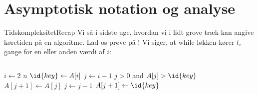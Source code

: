\documentclass[aspectratio=1610]{beamer}
\begin{document}
\section{Asymptotisk notation og analyse}

\begin{frame}{Tidskompleksitet}{Recap}
    Vi så i sidste uge, hvordan vi i lidt grove træk kan angive køretiden på en
    algoritme. Lad os prøve på ! Vi siger, at while-løkken
    kører $t_i$ gange for en eller anden værdi af $i$:

    \begin{columns}
        \begin{codebox}
            \li \For $i \gets 2$ \To $n$ \Do
                \li $\id{key} \gets A[i]$
                \li $j \gets i - 1$
                \li \While $j > 0$ and $A[j] > \id{key}$ \Do
                    \li $A[j+1] \gets A[j]$
                    \li $j \gets j - 1$
                \End
                \li $A[j+1] \gets \id{key}$
            \End
        \end{codebox}
        
        \begin{codebox}
            \zi {}
            \zi {}
            \zi {}
            \zi {}
            \zi {}
            \zi {}
            \zi {}
        \end{codebox}
    \end{columns}

    \medskip

\end{frame}
\end{document}
